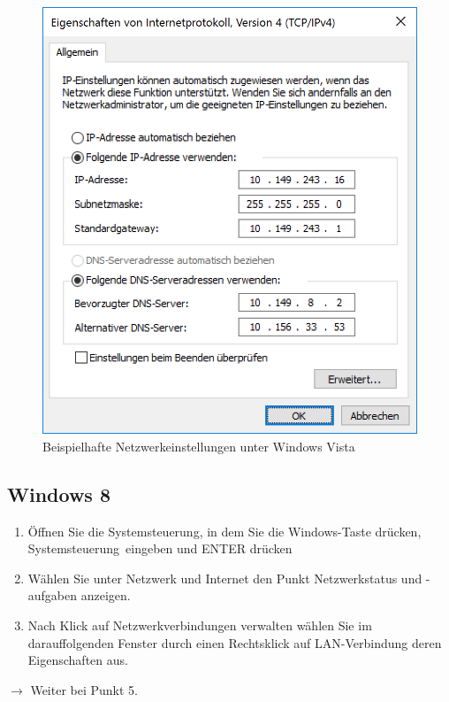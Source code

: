 \documentclass[a4paper,12pt]{scrartcl}
\begin{document}
\begin{figure}[h!]
\begin{minipage}[c]{0.48\linewidth}
          \includegraphics[width=\linewidth,keepaspectratio]{Bilder/IP_Windows_mb}
          \caption{Beispielhafte Netzwerkeinstellungen unter Windows Vista}
        \end{minipage}
      \vspace{-20pt}
      \end{figure}
\subsection*{Windows 8}
\begin{enumerate}
	\item Öffnen Sie die Systemsteuerung, in dem Sie die Windows-Taste drücken, \glqq Systemsteuerung\grqq  \ eingeben und ENTER drücken
	\item Wählen Sie unter Netzwerk und Internet den Punkt Netzwerkstatus und -aufgaben anzeigen.
    \item Nach Klick auf Netzwerkverbindungen verwalten wählen Sie im darauffolgenden Fenster durch einen Rechtsklick auf LAN-Verbindung deren Eigenschaften aus.
\end{enumerate}
$\rightarrow$ Weiter bei Punkt 5.
\end{document}
